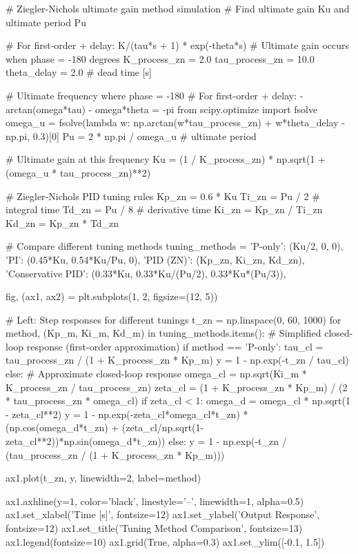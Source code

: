 \documentclass[11pt,a4paper]{article}
\begin{document}
\begin{pycode}
# Ziegler-Nichols ultimate gain method simulation
# Find ultimate gain Ku and ultimate period Pu

# For first-order + delay: K/(tau*s + 1) * exp(-theta*s)
# Ultimate gain occurs when phase = -180 degrees
K_process_zn = 2.0
tau_process_zn = 10.0
theta_delay = 2.0  # dead time [s]

# Ultimate frequency where phase = -180
# For first-order + delay: -arctan(omega*tau) - omega*theta = -pi
from scipy.optimize import fsolve
omega_u = fsolve(lambda w: np.arctan(w*tau_process_zn) + w*theta_delay - np.pi, 0.3)[0]
Pu = 2 * np.pi / omega_u  # ultimate period

# Ultimate gain at this frequency
Ku = (1 / K_process_zn) * np.sqrt(1 + (omega_u * tau_process_zn)**2)

# Ziegler-Nichols PID tuning rules
Kp_zn = 0.6 * Ku
Ti_zn = Pu / 2  # integral time
Td_zn = Pu / 8  # derivative time
Ki_zn = Kp_zn / Ti_zn
Kd_zn = Kp_zn * Td_zn

# Compare different tuning methods
tuning_methods = {
    'P-only': (Ku/2, 0, 0),
    'PI': (0.45*Ku, 0.54*Ku/Pu, 0),
    'PID (ZN)': (Kp_zn, Ki_zn, Kd_zn),
    'Conservative PID': (0.33*Ku, 0.33*Ku/(Pu/2), 0.33*Ku*(Pu/3)),
}

fig, (ax1, ax2) = plt.subplots(1, 2, figsize=(12, 5))

# Left: Step responses for different tunings
t_zn = np.linspace(0, 60, 1000)
for method, (Kp_m, Ki_m, Kd_m) in tuning_methods.items():
    # Simplified closed-loop response (first-order approximation)
    if method == 'P-only':
        tau_cl = tau_process_zn / (1 + K_process_zn * Kp_m)
        y = 1 - np.exp(-t_zn / tau_cl)
    else:
        # Approximate closed-loop response
        omega_cl = np.sqrt(Ki_m * K_process_zn / tau_process_zn)
        zeta_cl = (1 + K_process_zn * Kp_m) / (2 * tau_process_zn * omega_cl)
        if zeta_cl < 1:
            omega_d = omega_cl * np.sqrt(1 - zeta_cl**2)
            y = 1 - np.exp(-zeta_cl*omega_cl*t_zn) * (np.cos(omega_d*t_zn) + (zeta_cl/np.sqrt(1-zeta_cl**2))*np.sin(omega_d*t_zn))
        else:
            y = 1 - np.exp(-t_zn / (tau_process_zn / (1 + K_process_zn * Kp_m)))

    ax1.plot(t_zn, y, linewidth=2, label=method)

ax1.axhline(y=1, color='black', linestyle='--', linewidth=1, alpha=0.5)
ax1.set_xlabel('Time [s]', fontsize=12)
ax1.set_ylabel('Output Response', fontsize=12)
ax1.set_title('Tuning Method Comparison', fontsize=13)
ax1.legend(fontsize=10)
ax1.grid(True, alpha=0.3)
ax1.set_ylim([-0.1, 1.5])


\end{pycode}
\end{document}
